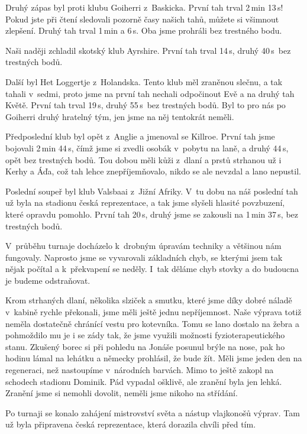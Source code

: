 \documentclass[11pt]{article}
\begin{document}
Druhý zápas byl proti klubu Goiherri z~Baskicka. První tah trval 2\,min 13\,s! Pokud jste při čtení sledovali pozorně časy našich tahů, můžete si všimnout zlepšení. Druhý tah trval 1\,min a 6\,s. Oba jsme prohráli bez trestného bodu.

Naši naději zchladil skotský klub Ayrshire. První tah trval 14\,s, druhý 40\,s~bez trestných bodů.

Další byl Het Loggertje z~Holandska. Tento klub měl zraněnou slečnu, a tak tahali v~sedmi, proto jsme na první tah nechali odpočinout Evě a na druhý tah Květě. První tah trval 19\,s, druhý 55\,s~bez trestných bodů. Byl to pro nás po Goiherri druhý hratelný tým, jen jsme na něj tentokrát neměli.

Předposlední klub byl opět z~Anglie a jmenoval se Killroe. První tah jsme bojovali 2\,min 44\,s, čímž jsme si zvedli osobák v~pobytu na laně, a druhý 44\,s, opět bez trestných bodů. Tou dobou měli kůži z~dlaní a prstů strhanou už i Kerhy a Áďa, což tah lehce znepříjemňovalo, nikdo se ale nevzdal a lano nepustil.

Poslední soupeř byl klub Valsbaai z~Jižní Afriky. V~tu dobu na náš poslední tah už byla na stadionu česká reprezentace, a tak jsme slyšeli hlasité povzbuzení, které opravdu pomohlo. První tah 20\,s, druhý jsme se zakousli na 1\,min 37\,s, bez trestných bodů.

V~průběhu turnaje docházelo k~drobným úpravám techniky a většinou nám fungovaly. Naprosto jsme se vyvarovali základních chyb, se kterými jsem tak nějak počítal a k~překvapení se neděly. I~tak děláme chyb stovky a do budoucna je budeme odstraňovat.

Krom strhaných dlaní, několika slziček a smutku, které jsme díky dobré náladě v~kabině rychle překonali, jsme měli ještě jednu nepříjemnost. Naše výprava totiž neměla dostatečně chránící vestu pro kotevníka. Tomu se lano dostalo na žebra a pohmoždilo mu je i se zády tak, že jsme využili možnosti fyzioterapeutického stanu. Zkušený borec si při pohledu na Jonáše posunul brýle na nose, pak ho hodinu lámal na lehátku a německy prohlásil, že bude žít. Měli jsme jeden den na regeneraci, než nastoupíme v~národních barvách. Mimo to ještě zakopl na schodech stadionu Dominik. Pád vypadal ošklivě, ale zranění byla jen lehká. Zranění jsme si nemohli dovolit, neměli jsme nikoho na střídání.

Po turnaji se konalo zahájení mistrovství světa a nástup vlajkonošů výprav. Tam už byla připravena česká reprezentace, která dorazila chvíli před tím.
\end{document}
